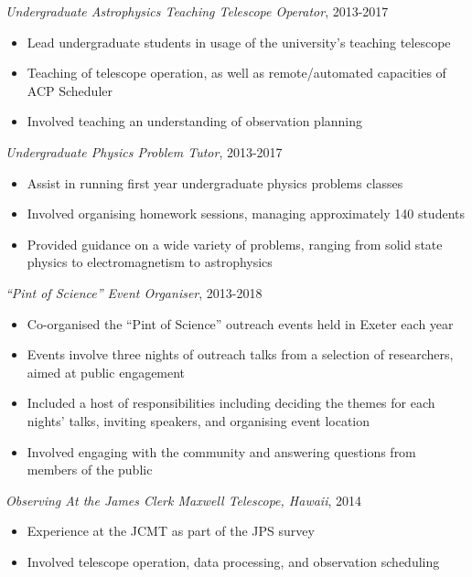 \documentclass[letter, margin, 10pt]{res} %
\begin{document}
\begin{resume}
\vspace{-10pt}

{\sl Undergraduate Astrophysics Teaching Telescope Operator}, 2013-2017
\begin{itemize}[noitemsep,topsep=0pt,parsep=0pt,partopsep=0pt]
\item Lead undergraduate students in usage of the university's teaching telescope
\item Teaching of telescope operation, as well as remote/automated capacities of ACP Scheduler
\item Involved teaching an understanding of observation planning
\end{itemize}

\vspace{-10pt}

{\sl Undergraduate Physics Problem Tutor}, 2013-2017
\begin{itemize}[noitemsep,topsep=0pt,parsep=0pt,partopsep=0pt]
\item Assist in running first year undergraduate physics problems classes
\item Involved organising homework sessions, managing approximately 140 students
\item Provided guidance on a wide variety of problems, ranging from solid state physics to electromagnetism to astrophysics
\end{itemize}

\vspace{-10pt}

{\sl ``Pint of Science'' Event Organiser}, 2013-2018
\begin{itemize}[noitemsep,topsep=0pt,parsep=0pt,partopsep=0pt]
\item Co-organised the ``Pint of Science'' outreach events held in Exeter each year
\item Events involve three nights of outreach talks from a selection of researchers, aimed at public engagement
\item Included a host of responsibilities including deciding the themes for each nights' talks, inviting speakers, and organising event location
\item Involved engaging with the community and answering questions from members of the public
\end{itemize}

\vspace{-10pt}

{\sl Observing At the James Clerk Maxwell Telescope, Hawaii}, 2014
\begin{itemize}[noitemsep,topsep=0pt,parsep=0pt,partopsep=0pt]
\item Experience at the JCMT as part of the JPS survey
\item Involved telescope operation, data processing, and observation scheduling
\end{itemize}


\end{resume}
\end{document}
